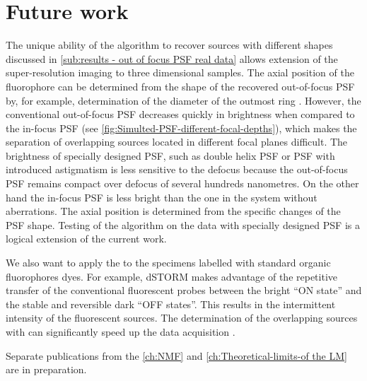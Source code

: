 \chapter{Future work\label{ch:Future work}}

The unique ability of the \inmf{} algorithm to recover sources with different shapes discussed in \autoref{sub:results - out of focus PSF real data} allows extension of the super-resolution imaging to three dimensional samples. The axial position of the fluorophore can be determined from the shape of the recovered out-of-focus PSF by, for example, determination of the diameter of the outmost ring \cite{Speidel2003}. However, the conventional out-of-focus PSF decreases quickly in brightness when compared to the in-focus PSF (see \autoref{fig:Simulted-PSF-different-focal-depths}), which makes the separation of overlapping sources located in different focal planes difficult. The brightness of specially designed PSF, such as double helix PSF \cite{Quirin2011} or PSF with introduced astigmatism \cite{Huang2008} is less sensitive to the defocus because the out-of-focus PSF remains compact over defocus of several hundreds nanometres. On the other hand the in-focus PSF is less bright than the one in the system without aberrations. The axial position is determined from the specific changes of the PSF shape. Testing of the \inmf{} algorithm on the data with specially designed PSF is a logical extension of the current work. 

We also want to apply the \inmf{} to the specimens labelled with standard organic fluorophores dyes. For example, dSTORM \cite{VandeLinde2011} makes advantage of the repetitive transfer of the conventional fluorescent probes between the bright ``ON state''  and the stable and reversible dark ``OFF states''. This results in the intermittent intensity of the fluorescent sources. The determination of the overlapping sources with \inmf{} can significantly speed up the data acquisition \cite{Small2009}.

Separate publications from the \autoref{ch:NMF} and \autoref{ch:Theoretical-limits-of the LM} are in preparation.